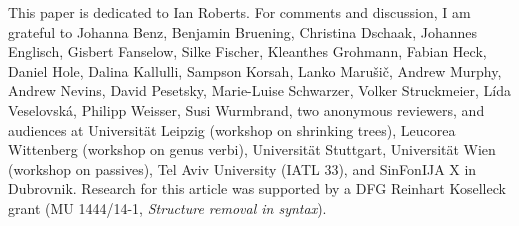 \documentclass[output=paper]{langsci/langscibook}
\begin{document}
This paper is dedicated to Ian Roberts.  For comments and discussion, I am
grateful to  Johanna Benz, Benjamin Bruening, Christina Dschaak, Johannes
Eng\-lisch, Gisbert Fanselow, Silke Fischer, Kleanthes Grohmann, Fabian Heck,
Daniel Hole, Dalina Kallulli, Sampson Korsah,  Lanko Maru\v{s}i\v{c}, Andrew
Murphy,  Andrew Nevins, David Pesetsky, Marie-Luise Schwarzer, Volker
Struckmeier,  L\'ida Veselovsk\'a,   Philipp Weisser, Susi Wurmbrand, two
anonymous reviewers, and audiences at Universität Leipzig (workshop on
shrinking trees), Leucorea Wittenberg (workshop on genus verbi),
Universität Stuttgart, Universität Wien (workshop on passives), Tel Aviv
University (IATL 33), and SinFonIJA X in Dubrovnik.  Research for this article
was supported by a DFG Reinhart Koselleck grant (MU 1444/14-1, {\itshape Structure
removal in syntax}).

{\sloppy\printbibliography[heading=subbibliography,notkeyword=this]}
\end{document}
